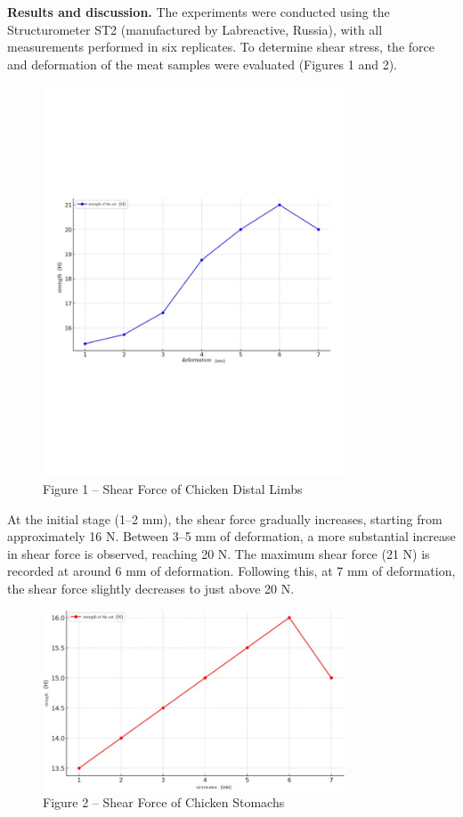 {\bfseries Results and discussion.} The experiments were conducted using
the Structurometer ST2 (manufactured by Labreactive, Russia), with all
measurements performed in six replicates. To determine shear stress, the
force and deformation of the meat samples were evaluated (Figures 1 and
2).

\begin{figure}[H]
	\centering
	\includegraphics[width=0.8\textwidth]{media/pish/image9}
	\caption*{Figure 1 -- Shear Force of Chicken Distal Limbs}
\end{figure}



At the initial stage (1--2 mm), the shear force gradually increases,
starting from approximately 16 N. Between 3--5 mm of deformation, a more
substantial increase in shear force is observed, reaching 20 N. The
maximum shear force (21 N) is recorded at around 6 mm of deformation.
Following this, at 7 mm of deformation, the shear force slightly
decreases to just above 20 N.

\begin{figure}[H]
	\centering
	\includegraphics[width=0.8\textwidth]{media/pish/image16}
	\caption*{Figure 2 -- Shear Force of Chicken Stomachs}
\end{figure}


